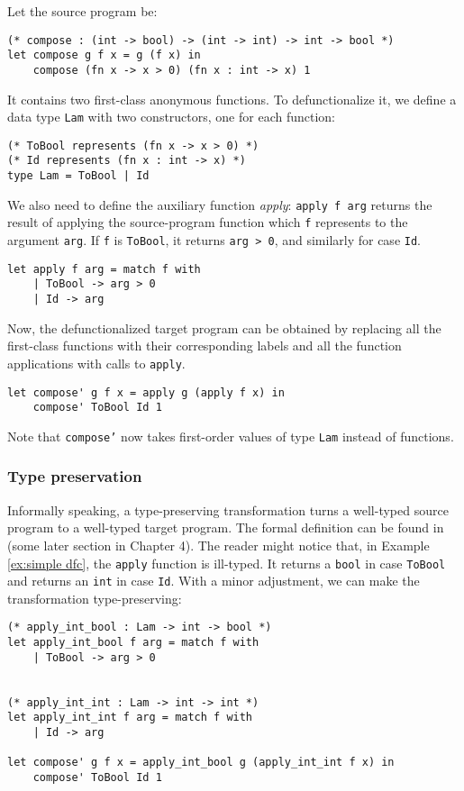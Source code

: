 \begin{exmp}
Let the source program be:

\begin{lstlisting}
(* compose : (int -> bool) -> (int -> int) -> int -> bool *) 
let compose g f x = g (f x) in
    compose (fn x -> x > 0) (fn x : int -> x) 1 
\end{lstlisting}
It contains two first-class anonymous functions. To defunctionalize it, we define a data type \texttt{Lam} with two constructors, one for each function:
\begin{lstlisting}
(* ToBool represents (fn x -> x > 0) *)
(* Id represents (fn x : int -> x) *)
type Lam = ToBool | Id
\end{lstlisting}
We also need to define the auxiliary function \textit{apply}: \texttt{apply f arg} returns the result of
applying the source-program function which \texttt{f} represents to the argument \texttt{arg}. If \texttt{f} is \texttt{ToBool}, it returns \texttt{arg > 0}, and similarly for case \texttt{Id}.
\begin{lstlisting}
let apply f arg = match f with
	| ToBool -> arg > 0
	| Id -> arg
\end{lstlisting}
Now, the defunctionalized target program can be obtained by replacing all the first-class functions with their corresponding labels and all the function applications with calls to \texttt{apply}.
\begin{lstlisting}
let compose' g f x = apply g (apply f x) in
    compose' ToBool Id 1
\end{lstlisting}
Note that \texttt{compose'} now takes first-order values of type \texttt{Lam} instead of functions.
\label{ex:simple dfc}
\end{exmp}

\subsubsection{Type preservation}

Informally speaking, a type-preserving transformation turns a well-typed source program to a well-typed target program. The formal definition can be found in (some later section in Chapter 4). The reader might notice that, in Example \ref{ex:simple dfc}, the \texttt{apply} function is ill-typed. It returns a \texttt{bool} in case \texttt{ToBool} and returns an \texttt{int} in case \texttt{Id}. With a minor adjustment, we can make the transformation type-preserving:
\begin{lstlisting}
(* apply_int_bool : Lam -> int -> bool *)
let apply_int_bool f arg = match f with
	| ToBool -> arg > 0


(* apply_int_int : Lam -> int -> int *)
let apply_int_int f arg = match f with
	| Id -> arg

let compose' g f x = apply_int_bool g (apply_int_int f x) in
    compose' ToBool Id 1
\end{lstlisting}

